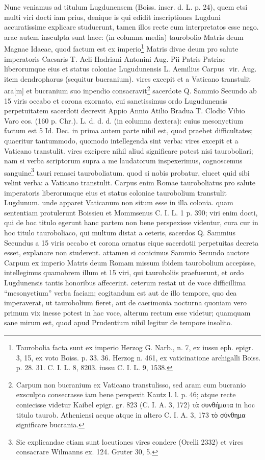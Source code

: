 \documentclass[a4paper, 11pt, oneside, polutonikogreek, german, twocolumn]{article}
\newcommand*\svgAD{}
\begin{document}
Nunc veniamus ad titulum Lugdunensem (Boiss. inscr. d. L. p. 24), quem etsi multi viri docti iam prius, denique is qui edidit inscriptiones Lugduni accuratissime explicare studuerunt, tamen illos recte eum interpretatos esse nego. arae autem insculpta sunt haec: (in columna media) taurobolio Matris deum Magnae Idaeae, quod factum est ex imperio\footnote{Taurobolia facta sunt ex imperio Herzog G. Narb., n. 7, ex iussu eph. epigr. 3, 15, ex voto Boiss. p. 33. 36. Herzog n. 461, ex vaticinatione archigalli Boiss. p. 28. 31. C. I. L. 8, 8203. iussu C. I. L. 9, 1538.} Matris divae deum pro salute imperatoris Caesaris T. Aeli Hadriani Antonini Aug. Pii Patris Patriae liberorumque eius et status coloniae Lugudunensis L. Aemilius Carpus $\svgAD$ vir. Aug. item dendrophorus (sequitur bucranium). vires excepit et a Vaticano transtulit ara[m] et bucranium suo inpendio consacravit\footnote{Carpum non bucranium ex Vaticano transtulisso, sed aram cum bucranio exsculpto consecrasse iam bene perspexit Kautz l. l. p. 46; atque recte coniecisse videtur Kaibel epigr. gr. 823 (C. I. A. 3, 172) τὰ συνθήματα in hoc titulo taurob. Atheniensi aeque atque in altero C. I. A. 3, 173 τὸ σύνθημα significare bucrania.} sacerdote Q. Sammio Secundo ab 15 viris occabo et corona exornato, cui sanctissimus ordo Lugudunensis perpetuitatem sacerdoti decrevit Appio Annio Atilio Bradua T. Clodio Vibio Varo cos. (160 p. Chr.). L. d. d. d. (in columna dextera): cuius mesonyctium factum est 5 Id. Dec. in prima autem parte nihil est, quod praebet difficultates; quaeritur tantummodo, quomodo intellegenda sint verba: vires excepit et a Vaticano transtulit. vires excipere nihil aliud significare potest nisi tauroboliari; nam si verba scriptorum supra a me laudatorum inspexerimus, cognoscemus sanguine\footnote{Sic explicandae etiam sunt locutiones vires condere (Orelli 2332) et vires consacrare Wilmanns ex. 124. Gruter 30, 5.} tauri renasci tauroboliatum. quod si nobis probatur, elucet quid sibi velint verba: a Vaticano transtulit. Carpus enim Romae tauroboliatus pro salute imperatoris liberorumque eius et status coloniae taurobolium transtulit Lugdunum. unde apparet Vaticanum non situm esse in illa colonia. quam sententiam protulerunt Boissieu et Mommsenus C. I. L. 1 p. 390; viri enim docti, qui de hoc titulo egerunt hanc partem non bene perspexisse videntur, cura cur in hoc titulo tauroboliaco, qui multum distat a ceteris, sacerdos Q. Sammius Secundus a 15 viris occabo et corona ornatus eique sacerdotii perpetuitas decreta esset, explanare non studerent. attamen si conicimus Sammio Secundo auctore Carpum ex imperio Matris deum Romam missum ibidem taurobolium accepisse, intellegimus quamobrem illum et 15 viri, qui tauroboliis praefuerunt, et ordo Lugdunensis tantis honoribus affecerint. ceterum restat ut de voce difficillima "`mesonyctium"' verba faciam; cogitandum est aut de illo tempore, quo dea imperaverat, ut taurobolium fieret, aut de caerimonia nocturna quoniam vero primum vix inesse potest in hac voce, alterum rectum esse videtur; quamquam sane mirum est, quod apud Prudentium nihil legitur de tempore insolito.
\end{document}
